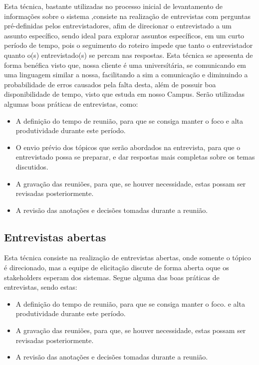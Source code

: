   Esta técnica, bastante utilizadas no processo inicial de levantamento de informações sobre o sistema
  ,consiste na realização de entrevistas com perguntas pré-definidas pelos entrevistadores, afim de direcionar o 
  entrevistado a um assunto específico, sendo ideal para explorar assuntos específicos, em um curto período de tempo,
  pois o seguimento do roteiro impede que tanto o entrevistador quanto o(s) entrevistado(s) se percam nas respostas. Esta 
  técnica se apresenta de forma benéfica visto que, nossa cliente é uma universítária, se comunicando em uma linguagem 
  similar a nossa, facilitando a sim a comunicação e diminuindo a probabilidade de erros causados pela falta desta, além de
  possuir boa disponibilidade de tempo, visto que estuda em nosso Campus.
  Serão utilizadas algumas boas práticas de entrevistas, como: 
  \begin{itemize}
  \item A definição do tempo de reunião, para que se consiga manter o foco
  e alta produtividade durante este período.
  \item O envio prévio dos tópicos que serão abordados na entrevista, para que o entrevistado possa se preparar, e dar respostas mais
  completas sobre os temas discutidos.
  \item A gravação das reuniões, para que, se houver necessidade, estas possam ser revisadas posteriormente.
  \item A revisão das anotações e decisões tomadas durante a reunião.
  \end{itemize}

  \subsection{Entrevistas abertas}
  
  Esta técnica consiste na realização de entrevistas abertas, onde somente o tópico é direcionado, mas a equipe de elicitação
  discute de forma aberta oque os stakeholders esperam dos sistemas. Segue alguma das boas práticas de entrevistas, sendo estas:
  \begin{itemize}
  \item A definição do tempo de reunião, para que se consiga manter o foco.
  e alta produtividade durante este período.
  \item A gravação das reuniões, para que, se houver necessidade, estas possam ser revisadas posteriormente.
  \item A revisão das anotações e decisões tomadas durante a reunião.
  \end{itemize}

